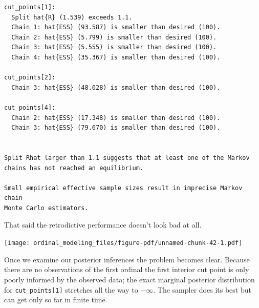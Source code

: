 \documentclass[
  letterpaper,
  DIV=11,
  numbers=noendperiod]{scrartcl}
\newenvironment{Shaded}{\begin{snugshade}}{\end{snugshade}}
\newcommand{\AttributeTok}[1]{\textcolor[rgb]{0.40,0.45,0.13}{#1}}
\newcommand{\DecValTok}[1]{\textcolor[rgb]{0.68,0.00,0.00}{#1}}
\newcommand{\FloatTok}[1]{\textcolor[rgb]{0.68,0.00,0.00}{#1}}
\newcommand{\FunctionTok}[1]{\textcolor[rgb]{0.28,0.35,0.67}{#1}}
\newcommand{\NormalTok}[1]{\textcolor[rgb]{0.00,0.23,0.31}{#1}}
\newcommand{\SpecialCharTok}[1]{\textcolor[rgb]{0.37,0.37,0.37}{#1}}
\newcommand{\StringTok}[1]{\textcolor[rgb]{0.13,0.47,0.30}{#1}}
\begin{document}
\begin{verbatim}
cut_points[1]:
  Split hat{R} (1.539) exceeds 1.1.
  Chain 1: hat{ESS} (93.587) is smaller than desired (100).
  Chain 2: hat{ESS} (5.799) is smaller than desired (100).
  Chain 3: hat{ESS} (5.555) is smaller than desired (100).
  Chain 4: hat{ESS} (35.367) is smaller than desired (100).

cut_points[2]:
  Chain 3: hat{ESS} (48.028) is smaller than desired (100).

cut_points[4]:
  Chain 2: hat{ESS} (17.348) is smaller than desired (100).
  Chain 3: hat{ESS} (79.670) is smaller than desired (100).


Split Rhat larger than 1.1 suggests that at least one of the Markov
chains has not reached an equilibrium.

Small empirical effective sample sizes result in imprecise Markov chain
Monte Carlo estimators.
\end{verbatim}

That said the retrodictive performance doesn't look bad at all.

\begin{Shaded}
\end{Shaded}

\texttt{[image: ordinal\_modeling\_files/figure-pdf/unnamed-chunk-42-1.pdf]}

Once we examine our posterior inferences the problem becomes clear.
Because there are no observations of the first ordinal the first
interior cut point is only poorly informed by the observed data; the
exact marginal posterior distribution for \texttt{cut\_points{[}1{]}}
stretches all the way to \(-\infty\). The sampler does its best but can
get only so far in finite time.
\end{document}
